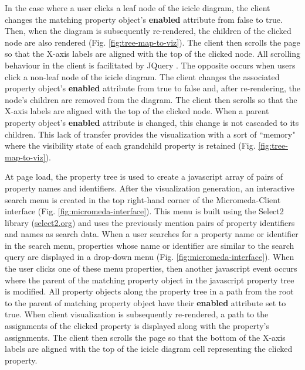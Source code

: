In the case where a user clicks a leaf node of the icicle diagram, the client changes the matching property object's \textbf{enabled} attribute from false to true. Then, when the diagram is subsequently re-rendered, the children of the clicked node are also rendered (Fig. \ref{fig:tree-map-to-viz}). The client then scrolls the page so that the X-axis labels are aligned with the top of the clicked node. All scrolling behaviour in the client is facilitated by JQuery \cite{li2012jquery}. The opposite occurs when users click a non-leaf node of the icicle diagram. The client changes the associated property object's \textbf{enabled} attribute from true to false and, after re-rendering, the node's children are removed from the diagram. The client then scrolls so that the X-axis labels are aligned with the top of the clicked node. When a parent property object's \textbf{enabled} attribute is changed, this change is not cascaded to its children. This lack of transfer provides the visualization with a sort of ``memory" where the visibility state of each grandchild property is retained (Fig. \ref{fig:tree-map-to-viz}).

At page load, the property tree is used to create a \gls{javascript} array of pairs of property names and identifiers. After the visualization generation, an interactive search menu is created in the top right-hand corner of the Micromeda-Client interface (Fig. \ref{fig:micromeda-interface}). This menu is built using the Select2 library \cite{select2} (\href{select2.org}{select2.org}) and uses the previously mention pairs of property identifiers and names as search data. When a user searches for a property name or identifier in the search menu, properties whose name or identifier are similar to the search query are displayed in a drop-down menu (Fig. \ref{fig:micromeda-interface}). When the user clicks one of these menu properties, then another \gls{javascript} event occurs where the parent of the matching property object in the \gls{javascript} property tree is modified. All property objects along the property tree in a path from the root to the parent of matching property object have their \textbf{enabled} attribute set to true. When client visualization is subsequently re-rendered, a path to the assignments of the clicked property is displayed along with the property's assignments. The client then scrolls the page so that the bottom of the X-axis labels are aligned with the top of the icicle diagram cell representing the clicked property.

